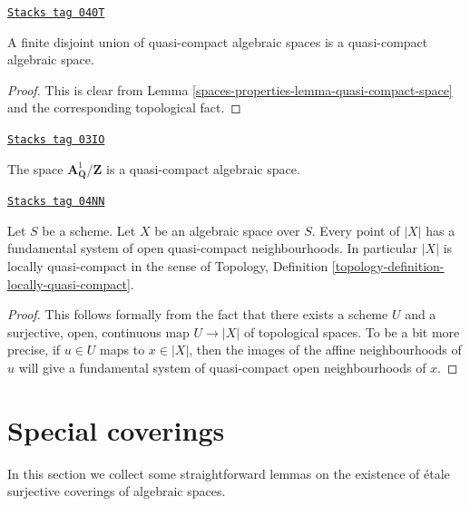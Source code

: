\begin{lemma}
\label{spaces-properties-lemma-finite-disjoint-quasi-compact}
\href{https://stacks.math.columbia.edu/tag/040T}{\texttt{Stacks tag 040T}}

A finite disjoint union of quasi-compact algebraic spaces is
a quasi-compact algebraic space.
\end{lemma}

\begin{proof}
This is clear from
Lemma \ref{spaces-properties-lemma-quasi-compact-space}
and the corresponding topological fact.
\end{proof}

\begin{example}
\label{spaces-properties-example-quasi-compact-not-very-reasonable}
\href{https://stacks.math.columbia.edu/tag/03IO}{\texttt{Stacks tag 03IO}}

The space $\mathbf{A}^1_{\mathbf{Q}}/\mathbf{Z}$ is a quasi-compact
algebraic space.
\end{example}

\begin{lemma}
\label{spaces-properties-lemma-space-locally-quasi-compact}
\href{https://stacks.math.columbia.edu/tag/04NN}{\texttt{Stacks tag 04NN}}

Let $S$ be a scheme.
Let $X$ be an algebraic space over $S$.
Every point of $|X|$ has a fundamental system of open
quasi-compact neighbourhoods.
In particular $|X|$ is locally quasi-compact in the sense of
Topology, Definition \ref{topology-definition-locally-quasi-compact}.
\end{lemma}

\begin{proof}
This follows formally from the fact that there exists a scheme
$U$ and a surjective, open, continuous map
$U \to |X|$ of topological spaces. To be a bit more precise, if
$u \in U$ maps to $x \in |X|$, then the images of the affine
neighbourhoods of $u$ will give a fundamental system of quasi-compact
open neighbourhoods of $x$.
\end{proof}

\section{Special coverings}
\label{spaces-properties-section-special-coverings}
In this section we collect some straightforward lemmas on the existence
of \'etale surjective coverings of algebraic spaces.

